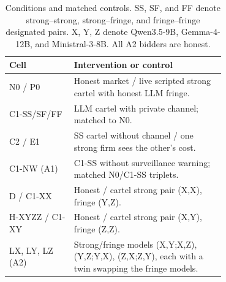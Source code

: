 \begin{table}[tb]
\centering\small
\caption{Conditions and matched controls. SS, SF, and FF denote strong--strong,
strong--fringe, and fringe--fringe designated pairs. X, Y, Z denote Qwen3.5-9B,
Gemma-4-12B, and Ministral-3-8B. All A2 bidders are honest.}
\label{tab:conditions}
\begin{tabular}{@{}lp{0.70\linewidth}@{}}
\toprule
Cell & Intervention or control \\
\midrule
N0 / P0 & Honest market / live scripted strong cartel with honest LLM fringe. \\
C1-SS/SF/FF & LLM cartel with private channel; matched to N0. \\
C2 / E1 & SS cartel without channel / one strong firm sees the other's cost. \\
C1-NW (A1) & C1-SS without surveillance warning; matched N0/C1-SS triplets. \\
D / C1-XX & Honest / cartel strong pair (X,X), fringe (Y,Z). \\
H-XYZZ / C1-XY & Honest / cartel strong pair (X,Y), fringe (Z,Z). \\
LX, LY, LZ (A2) & Strong/fringe models (X,Y;X,Z), (Y,Z;Y,X), (Z,X;Z,Y),
each with a twin swapping the fringe models. \\
\bottomrule
\end{tabular}
\end{table}
